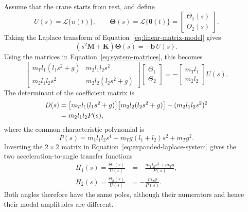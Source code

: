 \documentclass[a4paper,11pt]{article}
\begin{document}
Assume that the crane starts from rest, and define
\[
    U(s)=\mathcal L\{u(t)\},\qquad
    \boldsymbol{\Theta}(s)
    =\mathcal L\{\boldsymbol{\theta}(t)\}
    =
    \begin{bmatrix}
        \Theta_1(s)\\
        \Theta_2(s)
    \end{bmatrix}.
\]
Taking the Laplace transform of Equation~\eqref{eq:linear-matrix-model} gives
\begin{equation}
    (s^2\mathbf M+\mathbf K)\boldsymbol{\Theta}(s)
    =-\mathbf b\,U(s).
    \label{eq:laplace-matrix-model}
\end{equation}
Using the matrices in Equation~\eqref{eq:system-matrices}, this becomes
\begin{equation}
    \begin{bmatrix}
        m_Tl_1(l_1s^2+g) & m_2l_1l_2s^2\\
        m_2l_1l_2s^2 & m_2l_2(l_2s^2+g)
    \end{bmatrix}
    \begin{bmatrix}
        \Theta_1\\
        \Theta_2
    \end{bmatrix}
    =
    -\begin{bmatrix}
        m_Tl_1\\
        m_2l_2
    \end{bmatrix}U(s).
    \label{eq:expanded-laplace-system}
\end{equation}
The determinant of the coefficient matrix is
\begin{align}
    D(s)
    &=
    \bigl[m_Tl_1(l_1s^2+g)\bigr]
    \bigl[m_2l_2(l_2s^2+g)\bigr]
    -(m_2l_1l_2s^2)^2 \notag\\
    &=m_2l_1l_2P(s),
    \label{eq:laplace-determinant}
\end{align}
where the common characteristic polynomial is
\begin{equation}
    P(s)=m_1l_1l_2s^4
    +m_Tg(l_1+l_2)s^2
    +m_Tg^2.
    \label{eq:characteristic-polynomial}
\end{equation}
Inverting the \(2\times2\) matrix in
Equation~\eqref{eq:expanded-laplace-system} gives the two acceleration-to-angle
transfer functions
\begin{align}
    H_1(s)
    =\frac{\Theta_1(s)}{U(s)}
    &=-\frac{m_1l_2s^2+m_Tg}{P(s)},
    \label{eq:transfer-theta1}\\
    H_2(s)
    =\frac{\Theta_2(s)}{U(s)}
    &=-\frac{m_Tg}{P(s)}.
    \label{eq:transfer-theta2}
\end{align}
Both angles therefore have the same poles, although their numerators and hence
their modal amplitudes are different.
\end{document}
